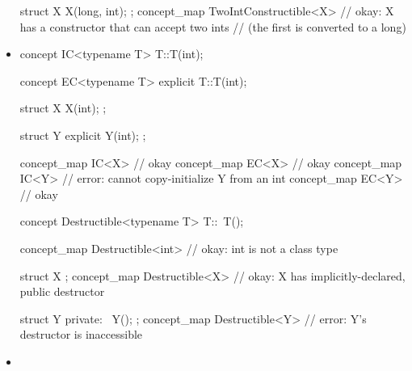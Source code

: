 \documentclass[american]{book}
\begin{document}
\begin{paras}
\begin{itemize}
\begin{codeblock}
struct X { X(long, int); };
concept_map TwoIntConstructible<X> { } // okay: X has a constructor that can accept two ints 
                                       // (the first is converted to a long)
\end{codeblock}
\addedConcepts{\exitexample}

\item {}
    \addedConcepts{\enterexample}
\begin{codeblock}
concept IC<typename T> {
  T::T(int);
}

concept EC<typename T> {
  explicit T::T(int);
}

struct X {
  X(int);
};

struct Y {
  explicit Y(int);
};

concept_map IC<X> { } // okay
concept_map EC<X> { } // okay
concept_map IC<Y> { } // error: cannot copy-initialize Y from an int
concept_map EC<Y> { } // okay
\end{codeblock}
\addedConcepts{\exitexample}

\addedConcepts{\enterexample}
\begin{codeblock}
concept Destructible<typename T> {
  T::~T();
}

concept_map Destructible<int> { } // okay: int is not a class type

struct X { };
concept_map Destructible<X> { } // okay: X has implicitly-declared, public destructor

struct Y { private: ~Y(); };
concept_map Destructible<Y> { } // error: Y's destructor is inaccessible
\end{codeblock}
\addedConcepts{\exitexample}

\item {}


\end{itemize}
\end{paras}
\end{document}
